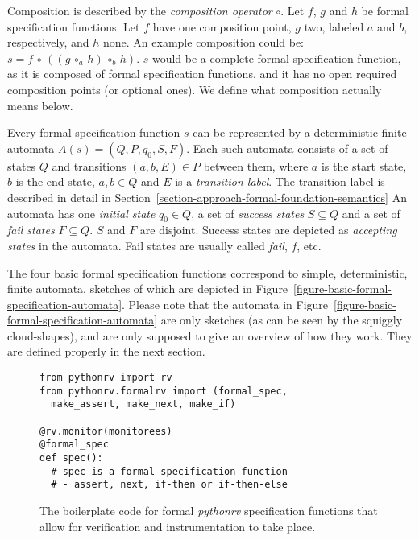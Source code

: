 \begin{mydef}\label{def-composition-operator}
Composition is described by the \textit{composition operator} $\circ$. Let $f$,
$g$ and $h$ be formal specification functions. Let $f$ have one composition
point, $g$ two, labeled $a$ and $b$, respectively, and $h$ none. An example
composition could be: $s = f \, \circ \, ((g \, \circ_{a} \, h) \, \circ_{b} \,
h)$. $s$ would be a complete formal specification function, as it is composed
of formal specification functions, and it has no open required composition
points (or optional ones). We define what composition actually means below.
\end{mydef}

\begin{mydef}[automata]\label{def-automata}
Every formal specification function $s$ can be represented by a deterministic
finite automata $A(s) = (Q, P, q_0, S, F)$. Each such automata consists of a
set of states $Q$ and transitions $(a, b, E) \in P$ between them, where $a$ is
the start state, $b$ is the end state, $a,b \in Q$ and $E$ is a
\textit{transition label}. The transition label is described in detail in
Section~\ref{section-approach-formal-foundation-semantics} An automata has one
\textit{initial state} $q_0 \in Q$, a set of \textit{success states} $S
\subseteq Q$ and a set of \textit{fail states} $F \subseteq Q$. $S$ and $F$ are
disjoint. Success states are depicted as \textit{accepting states} in the
automata. Fail states are usually called \textit{fail}, $f$, etc.
\end{mydef}

The four basic formal specification functions correspond to simple,
deterministic, finite automata, sketches of which are depicted in
Figure~\ref{figure-basic-formal-specification-automata}. Please note that the
automata in Figure~\ref{figure-basic-formal-specification-automata} are only
sketches (as can be seen by the squiggly cloud-shapes), and are only supposed
to give an overview of how they work. They are defined properly in the next
section.

\begin{figure}[h!]
	\begin{center}
	\begin{minipage}{0.7\textwidth}
	\begin{lstlisting}
from pythonrv import rv
from pythonrv.formalrv import (formal_spec,
  make_assert, make_next, make_if)

@rv.monitor(monitorees)
@formal_spec
def spec():
  # spec is a formal specification function
  # - assert, next, if-then or if-then-else
	\end{lstlisting}
	\end{minipage}
	\end{center}

  \caption{The boilerplate code for formal \textit{pythonrv} specification
  functions that allow for verification and instrumentation to take place.}
	\label{figure-formal-boilerplate}
\end{figure}

